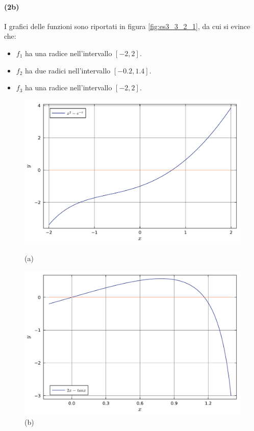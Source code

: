 \documentclass[letterpaper, 12pt]{article}
\begin{document}
\paragraph{(2b) } I grafici delle funzioni sono riportati in figura \ref{fig:es3_3_2_1}, da cui si evince che:
\begin{itemize}
    \item $f_1$ ha una radice nell'intervallo $[-2,2]$.
    \item $f_2$ ha due radici nell'intervallo $[-0.2,1.4]$.
    \item $f_3$ ha una radice nell'intervallo $[-2,2]$.
\end{itemize}

\begin{figure}[!ht]
    \centering
    \begin{minipage}[b]{0.47\textwidth}
        \includegraphics[width=\textwidth]{3321.pdf}
        \caption*{(a)}
    \end{minipage}
    \hspace{0.5cm}
    \begin{minipage}[b]{0.47\textwidth}
        \includegraphics[width=\textwidth]{3322.pdf}
        \caption*{(b)}
    \end{minipage}


\end{figure}
\end{document}
